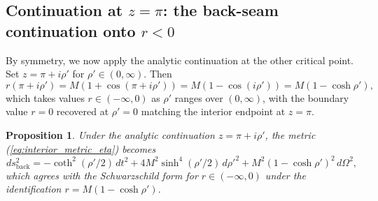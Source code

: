 \documentclass[11pt,a4paper]{article}
\newtheorem{proposition}[theorem]{Proposition}
\theoremstyle{definition}
\begin{document}
\subsection{Continuation at \texorpdfstring{$z=\pi$}{z=π}: the back-seam continuation onto \texorpdfstring{$r<0$}{r<0}}

By symmetry, we now apply the analytic continuation at the other critical point. Set $z = \pi + i\rho'$ for $\rho' \in (0,\infty)$. Then
\begin{equation}\label{eq:r_RegionIV}
r(\pi + i\rho') = M(1 + \cos(\pi + i\rho')) = M(1 - \cos(i\rho')) = M(1 - \cosh\rho'),
\end{equation}
which takes values $r \in (-\infty, 0)$ as $\rho'$ ranges over $(0,\infty)$, with the boundary value $r=0$ recovered at $\rho'=0$ matching the interior endpoint at $z = \pi$.

\begin{proposition}\label{prop:back_seam_metric}
Under the analytic continuation $z = \pi + i\rho'$, the metric (\ref{eq:interior_metric_eta}) becomes
\begin{equation}\label{eq:back_seam_metric}
ds^2_{\text{back}} = -\coth^2(\rho'/2)\, dt^2 + 4M^2 \sinh^4(\rho'/2)\, d\rho'^2 + M^2(1 - \cosh\rho')^2\, d\Omega^2,
\end{equation}
which agrees with the Schwarzschild form for $r \in (-\infty, 0)$ under the identification $r = M(1-\cosh\rho')$.
\end{proposition}
\end{document}

